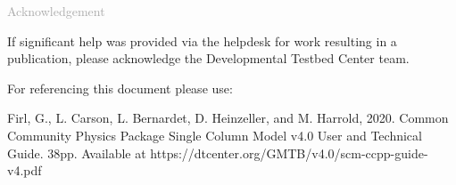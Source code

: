 \begin{titlepage}
\vspace*{0.5cm}
\noindent

\begin{flushleft}
\textcolor{darkgray}{\LARGE Acknowledgement}
\vspace*{1cm}\par

If significant help was provided via the helpdesk for work resulting in a publication, please acknowledge the Developmental Testbed Center team.\\
\vspace*{1cm}\par
For referencing this document please use:\\
\vspace*{1cm}\par
Firl, G., L. Carson, L. Bernardet, D. Heinzeller, and M. Harrold, 2020. Common Community Physics Package Single Column Model v4.0 User and Technical Guide. 38pp. Available at https://dtcenter.org/GMTB/v4.0/scm-ccpp-guide-v4.pdf

\end{flushleft}
\end{titlepage}
\pagebreak{}
